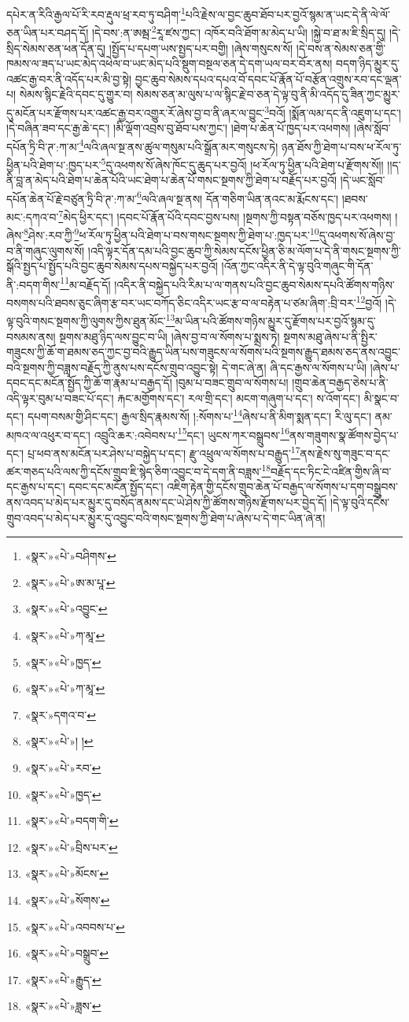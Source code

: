 དཔེར་ན་རིའི་རྒྱལ་པོ་རི་རབ་རྡུལ་ཕྲ་རབ་ཏུ་བཤིག་\footnote{«སྣར་»«པེ་»བཤིགས་}པའི་རྗེས་ལ་བྱང་ཆུབ་ཐོབ་པར་བྱའོ་སྙམ་ན་ཡང་དེ་ནི་ལེ་ལོ་ཅན་ཡིན་པར་བཤད་དོ། །དེ་བས་:ན་ཨམྦ་\footnote{«སྣར་»«པེ་»ཨ་མ་པཱ་}རཱ་ཛས་ཀྱང་། འཁོར་བའི་ཐོག་མ་མེད་པ་ཡི། །སྐྱེ་བ་ཐ་མ་ཇི་སྲིད་དུ། །དེ་སྲིད་སེམས་ཅན་ཕན་དོན་དུ། །སྤྱོད་པ་དཔག་ཡས་སྤྱད་པར་བགྱི། །ཞེས་གསུངས་སོ། །དེ་བས་ན་སེམས་ཅན་གྱི་ཁམས་ལ་ཟད་པ་ཡང་མེད་འཕེལ་བ་ཡང་མེད་པའི་སྡུག་བསྔལ་ཅན་དེ་དག་ཡལ་བར་བོར་ནས། བདག་ཉིད་མྱུར་དུ་འཚང་རྒྱ་བར་ནི་འདོད་པར་མི་བྱ་སྟེ། བྱང་ཆུབ་སེམས་དཔའ་དཔའ་བོ་དབང་པོ་རྣོན་པོ་བརྩོན་འགྲུས་རབ་དང་ལྡན་པ། སེམས་སྙིང་རྗེའི་དབང་དུ་གྱུར་བ། སེམས་ཅན་མ་ལུས་པ་ལ་སྙིང་རྗེ་བ་ཅན་དེ་ལྟ་བུ་ནི་མི་འདོད་དུ་ཟིན་ཀྱང་མྱུར་དུ་མངོན་པར་རྫོགས་པར་འཚང་རྒྱ་བར་འགྱུར་རོ་ཞེས་བྱ་བ་ནི་ཞར་ལ་བྱུང་\footnote{«སྣར་»«པེ་»འབྱུང་}བའོ། །སྨོན་ལམ་དང་ནི་འཇུག་པ་དང་། །དེ་བཞིན་ཟབ་དང་རྒྱ་ཆེ་དང་། །མི་ལྡོག་འབྲས་བུ་ཐོབ་པས་ཀྱང་། །ཐེག་པ་ཆེན་པོ་ཁྱད་པར་འཕགས། །ཞེས་སློབ་དཔོན་ཏྲི་བི་ཊ་:ཀ་མ་\footnote{«སྣར་»«པེ་»ཀ་མཱ་}ལའི་ཞལ་སྔ་ནས་ཚུལ་གསུམ་པའི་སྒྲོན་མར་གསུངས་ཏེ། ཉན་ཐོས་ཀྱི་ཐེག་པ་བས་ཕ་རོལ་ཏུ་ཕྱིན་པའི་ཐེག་པ་:ཁྱད་པར་\footnote{«སྣར་»«པེ་»ཁྱད་}དུ་འཕགས་སོ་ཞེས་ཁོང་དུ་ཆུད་པར་བྱའོ། །ཕ་རོལ་ཏུ་ཕྱིན་པའི་ཐེག་པ་རྫོགས་སོ།། །།ད་ནི་བླ་ན་མེད་པའི་ཐེག་པ་ཆེན་པོའི་ཡང་ཐེག་པ་ཆེན་པོ་གསང་སྔགས་ཀྱི་ཐེག་པ་བརྗོད་པར་བྱའོ། །དེ་ཡང་སློབ་དཔོན་ཆེན་པོ་རྗེ་བཙུན་ཏྲི་བི་ཊ་:ཀ་མ་\footnote{«སྣར་»«པེ་»ཀ་མཱ་}ལའི་ཞལ་སྔ་ནས། དོན་གཅིག་ཡིན་ནའང་མ་རྨོངས་དང་། །ཐབས་མང་:དཀའ་བ་\footnote{«སྣར་»དགའ་བ་}མེད་ཕྱིར་དང་། །དབང་པོ་རྣོན་པོའི་དབང་བྱས་པས། །སྔགས་ཀྱི་བསྟན་བཅོས་ཁྱད་པར་འཕགས། །ཞེས་\footnote{«སྣར་»«པེ་»། །}ཤེས་:རབ་ཀྱི་\footnote{«སྣར་»«པེ་»རབ་}ཕ་རོལ་ཏུ་ཕྱིན་པའི་ཐེག་པ་བས་གསང་སྔགས་ཀྱི་ཐེག་པ་:ཁྱད་པར་\footnote{«སྣར་»«པེ་»ཁྱད་}དུ་འཕགས་སོ་ཞེས་བྱ་བ་ནི་གཞུང་ལུགས་སོ། །འདི་ལྟར་དོན་དམ་པའི་བྱང་ཆུབ་ཀྱི་སེམས་དངོས་ཕྱིན་ཅི་མ་ལོག་པ་དེ་ནི་གསང་སྔགས་ཀྱི་སྒོའི་སྤྱད་པ་སྤྱོད་པའི་བྱང་ཆུབ་སེམས་དཔས་བསྐྱེད་པར་བྱའོ། །འོན་ཀྱང་འདིར་ནི་དེ་ལྟ་བུའི་གཞུང་གི་དོན་ནི་:བདག་གིས་\footnote{«སྣར་»«པེ་»བདག་གི་}མ་བརྗོད་དོ། །འདིར་ནི་བསྐྱེད་པའི་རིམ་པ་ལ་གནས་པའི་བྱང་ཆུབ་སེམས་དཔའི་ཚོགས་གཉིས་བསགས་པའི་ཐབས་ཅུང་ཞིག་རྩ་བར་ཡང་བཀོད་ཅིང་འདིར་ཡང་རྩ་བ་ལ་བརྟེན་པ་ཙམ་ཞིག་:བྲི་བར་\footnote{«སྣར་»«པེ་»བྲིས་པར་}བྱའོ། །དེ་ལྟ་བུའི་གསང་སྔགས་ཀྱི་ལུགས་ཀྱིས་ཐུན་མོང་\footnote{«སྣར་»«པེ་»མོངས་}མ་ཡིན་པའི་ཚོགས་གཉིས་མྱུར་དུ་རྫོགས་པར་བྱའོ་སྙམ་དུ་བསམས་ནས། སྔགས་མཐུ་ཉིད་ལས་བྱུང་བ་ཡི། །ཞེས་བྱ་བ་ལ་སོགས་པ་སྨྲས་ཏེ། སྔགས་མཐུ་ཞེས་པ་ནི་སྤྱིར་གཟུངས་ཀྱི་ཆོ་ག་ཐམས་ཅད་ཀྱང་བྱ་བའི་རྒྱུད་ཡིན་པས་གཟུངས་ལ་སོགས་པའི་སྔགས་རྒྱུད་ཐམས་ཅད་ནས་འབྱུང་བའི་སྔགས་ཀྱི་བཟླས་བརྗོད་ཀྱི་ནུས་པས་དངོས་གྲུབ་འབྱུང་སྟེ། དེ་གང་ཞེ་ན། ཞི་དང་རྒྱས་ལ་སོགས་པ་ཡི། །ཞེས་པ་དབང་དང་མངོན་སྤྱོད་ཀྱི་ཆོ་ག་རྣམ་པ་བརྒྱད་དོ། །བུམ་པ་བཟང་གྲུབ་ལ་སོགས་པ། །གྲུབ་ཆེན་བརྒྱད་ཅེས་པ་ནི་འདི་ལྟར་བུམ་པ་བཟང་པོ་དང་། རྐང་མགྱོགས་དང་། རལ་གྲི་དང་། མངག་གཞུག་པ་དང་། ས་འོག་དང་། མི་སྣང་བ་དང་། དཔག་བསམ་གྱི་ཤིང་དང་། རྒྱལ་སྲིད་རྣམས་སོ། །:སོགས་པ་\footnote{«སྣར་»«པེ་»སོགས་}ཞེས་པ་ནི་མིག་སྨན་དང་། རི་ལུ་དང་། ནམ་མཁའ་ལ་འཕུར་བ་དང་། འབྲུའི་ཆར་:འབེབས་པ་\footnote{«སྣར་»«པེ་»འབབས་པ་}དང་། ཡུངས་ཀར་བསྒྲུབས་\footnote{«སྣར་»«པེ་»བསྒྲུབ་}ནས་གཟུགས་སྣ་ཚོགས་བྱེད་པ་དང་། པྲ་ཕབ་ནས་མངོན་པར་ཤེས་པ་བསྐྱེད་པ་དང་། རྫུ་འཕྲུལ་ལ་སོགས་པ་བརྒྱུད་\footnote{«སྣར་»«པེ་»རྒྱུད་}ནས་རྗེས་སུ་གཟུང་བ་དང་ཚར་གཅད་པའི་ལས་ཀྱི་དངོས་གྲུབ་ཇི་སྙེད་ཅིག་འབྱུང་བ་དེ་དག་ནི་བཟླས་\footnote{«སྣར་»«པེ་»ཟླས་}བརྗོད་དང་ཏིང་ངེ་འཛིན་གྱིས་ཞི་བ་དང་རྒྱས་པ་དང་། དབང་དང་མངོན་སྤྱོད་དང་། འཇིག་རྟེན་གྱི་དངོས་གྲུབ་ཆེན་པོ་བརྒྱད་ལ་སོགས་པ་དག་བསྒྲུབས་ནས་འབད་པ་མེད་པར་མྱུར་དུ་བསོད་ནམས་དང་ཡེ་ཤེས་ཀྱི་ཚོགས་གཉིས་རྫོགས་པར་བྱེད་དོ། །དེ་ལྟ་བུའི་དངོས་གྲུབ་འབད་པ་མེད་པར་མྱུར་དུ་འབྱུང་བའི་གསང་སྔགས་ཀྱི་ཐེག་པ་ཞེས་པ་དེ་གང་ཡིན་ཞེ་ན། 